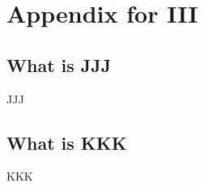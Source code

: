 \chapter{Appendix for III}
\minitoc

\section{What is JJJ}\label{sec:apdx-JJJ}
JJJ

\section{What is KKK}\label{sec:apdx-KKK}
KKK

